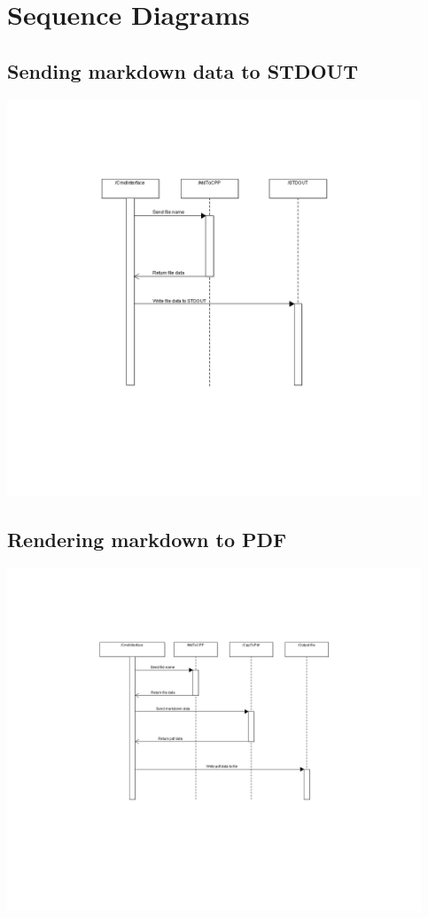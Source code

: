 \section{Sequence Diagrams}

\subsection{Sending markdown data to STDOUT}
\noindent\includegraphics[width=350pt]{images/mdOutput.png}

\subsection{Rendering markdown to PDF}
\noindent\includegraphics[width=350pt]{images/mdToPdf.png}

